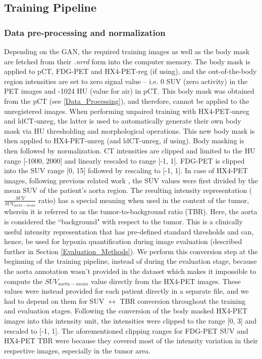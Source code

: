 \subsection{Training Pipeline}

\subsubsection{Data pre-processing and normalization}
Depending on the GAN, the required training images as well as the body mask are fetched from their \textit{.nrrd} form into the computer memory. The body mask is applied to pCT, FDG-PET and HX4-PET-reg (if using), and the out-of-the-body region intensities are set to zero signal value -- i.e. 0 SUV (zero activity) in the PET images and -1024 HU (value for air) in pCT. This body mask was obtained from the pCT (see \ref{Data_Processing}), and therefore, cannot be applied to the unregistered images. When performing unpaired training with HX4-PET-unreg and ldCT-unreg, the latter is used to automatically generate their own body mask via HU thresholding and morphological operations. This new body mask is then applied to HX4-PET-unreg (and ldCT-unreg, if using). Body masking is then followed by normalization. CT intensities are clipped and limited to the HU range [-1000, 2000] and linearly rescaled to range [-1, 1]. FDG-PET is clipped into the SUV range [0, 15] followed by rescaling to [-1, 1]. In case of HX4-PET images, following previous related work \cite{even2017predicting}, the SUV values were first divided by the mean SUV of the patient's aorta region. The resulting intensity representation ($\frac{SUV}{SUV_{aorta-mean}}$ ratio) has a special meaning when used in the context of the tumor, wherein it is referred to as the tumor-to-background ratio (TBR). Here, the aorta is considered the ``background" with respect to the tumor. This is a clinically useful intensity representation that has pre-defined standard thresholds \cite{zegers2013hypoxia} and can, hence, be used for hypoxia quantification during image evaluation (described further in Section \ref{Evaluation_Methods}). We perform this conversion step at the beginning of the training pipeline, instead of during the evaluation stage, because the aorta annotation wasn't provided in the dataset which makes it impossible to compute the $SUV_{aorta-mean}$ value directly from the HX4-PET images. These values were instead provided for each patient directly in a separate file, and we had to depend on them for SUV $\longleftrightarrow$ TBR conversion throughout the training and evaluation stages. Following the conversion of the body masked HX4-PET images into this intensity unit, the intensities were clipped to the range [0, 3] and rescaled to [-1, 1]. The aforementioned clipping ranges for FDG-PET SUV and HX4-PET TBR were because they covered most of the intensity variation in their respective images, especially in the tumor area.


